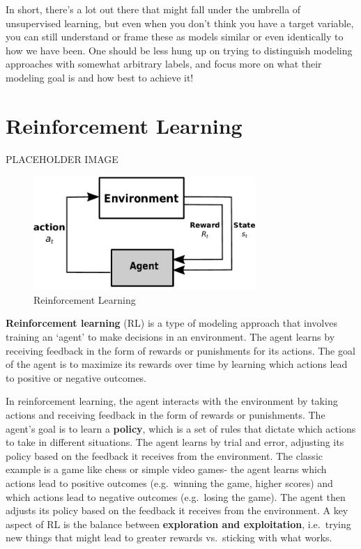 \documentclass[
  letterpaper,
]{krantz}
\begin{document}
In short, there's a lot out there that might fall under the umbrella of
unsupervised learning, but even when you don't think you have a target
variable, you can still understand or frame these as models similar or
even identically to how we have been. One should be less hung up on
trying to distinguish modeling approaches with somewhat arbitrary
labels, and focus more on what their modeling goal is and how best to
achieve it!

\section{Reinforcement Learning}\label{reinforcement-learning}

PLACEHOLDER IMAGE

\begin{figure}

{\centering \includegraphics[width=0.75\textwidth,height=\textheight]{img/rl.png}

}

\caption{Reinforcement Learning}

\end{figure}

\textbf{Reinforcement learning} (RL) is a type of modeling approach that
involves training an `agent' to make decisions in an environment. The
agent learns by receiving feedback in the form of rewards or punishments
for its actions. The goal of the agent is to maximize its rewards over
time by learning which actions lead to positive or negative outcomes.

In reinforcement learning, the agent interacts with the environment by
taking actions and receiving feedback in the form of rewards or
punishments. The agent's goal is to learn a \textbf{policy}, which is a
set of rules that dictate which actions to take in different situations.
The agent learns by trial and error, adjusting its policy based on the
feedback it receives from the environment. The classic example is a game
like chess or simple video games- the agent learns which actions lead to
positive outcomes (e.g.~winning the game, higher scores) and which
actions lead to negative outcomes (e.g.~losing the game). The agent then
adjusts its policy based on the feedback it receives from the
environment. A key aspect of RL is the balance between
\textbf{exploration and exploitation}, i.e.~trying new things that might
lead to greater rewards vs.~sticking with what works.
\end{document}
